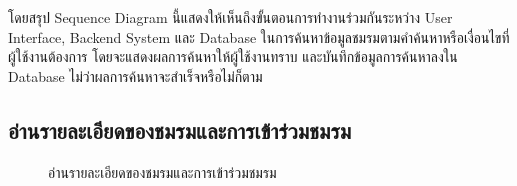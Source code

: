 \documentclass[14pt,oneside,openright,a4paper]{cpe-thai-project}
\begin{document}
  โดยสรุป Sequence Diagram นี้แสดงให้เห็นถึงขั้นตอนการทำงานร่วมกันระหว่าง User Interface, Backend System และ Database ในการค้นหาข้อมูลชมรมตามคำค้นหาหรือเงื่อนไขที่ผู้ใช้งานต้องการ โดยจะแสดงผลการค้นหาให้ผู้ใช้งานทราบ และบันทึกข้อมูลการค้นหาลงใน Database ไม่ว่าผลการค้นหาจะสำเร็จหรือไม่ก็ตาม

  \newpage

\subsection{อ่านรายละเอียดของชมรมและการเข้าร่วมชมรม}

  \begin{figure}[!h]\centering
    \setlength{\fboxrule}{0.5mm} %
    \setlength{\fboxsep}{0.5cm}
    \caption{อ่านรายละเอียดของชมรมและการเข้าร่วมชมรม}\label{fig:Select and join club}
  \end{figure}
\end{document}

